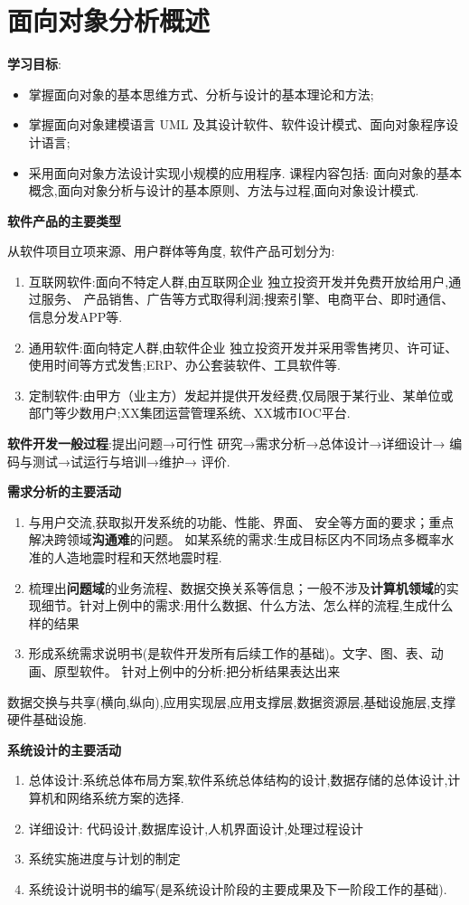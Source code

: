 \documentclass[../main.tex]{subfiles}
\begin{document}
\section{面向对象分析概述}
\textbf{学习目标}:
\begin{itemize}
  \item 掌握面向对象的基本思维方式、分析与设计的基本理论和方法;
  \item 掌握面向对象建模语言 UML
    及其设计软件、软件设计模式、面向对象程序设计语言;
  \item 采用面向对象方法设计实现小规模的应用程序. 课程内容包括:
    面向对象的基本概念,面向对象分析与设计的基本原则、方法与过程,面向对象设计模式.
\end{itemize}
\textbf{软件产品的主要类型}

从软件项目立项来源、用户群体等角度, 软件产品可划分为:
\begin{enumerate}
  \item 互联网软件:面向不特定人群,由互联网企业
    独立投资开发并免费开放给用户,通过服务、
    产品销售、广告等方式取得利润;搜索引擎、电商平台、即时通信、信息分发APP等.
  \item 通用软件:面向特定人群,由软件企业 独立投资开发并采用零售拷贝、许可证、
    使用时间等方式发售;ERP、办公套装软件、工具软件等.
  \item
    定制软件:由甲方（业主方）发起并提供开发经费,仅局限于某行业、某单位或部门等少数用户;XX集团运营管理系统、XX城市IOC平台.
\end{enumerate}
\textbf{软件开发一般过程}:提出问题→可行性 研究→需求分析→总体设计→详细设计→
编码与测试→试运行与培训→维护→ 评价.

\textbf{需求分析的主要活动}
\begin{enumerate}
  \item 与用户交流,获取拟开发系统的功能、性能、界面、
    安全等方面的要求；重点解决跨领域\textbf{沟通难}的问题。
    如某系统的需求:生成目标区内不同场点多概率水准的人造地震时程和天然地震时程.
  \item 梳理出\textbf{问题域}的业务流程、数据交换关系等信息；一般不涉及\textbf{计算机领域}的实现细节。针对上例中的需求:用什么数据、什么方法、怎么样的流程,生成什么样的结果
  \item 形成系统需求说明书(是软件开发所有后续工作的基础)。文字、图、表、动画、原型软件。
    针对上例中的分析:把分析结果表达出来
\end{enumerate}
数据交换与共享(横向,纵向),应用实现层,应用支撑层,数据资源层,基础设施层,支撑硬件基础设施.

\textbf{系统设计的主要活动}
\begin{enumerate}
  \item 总体设计:系统总体布局方案,软件系统总体结构的设计,数据存储的总体设计,计算机和网络系统方案的选择.
  \item 详细设计: 代码设计,数据库设计,人机界面设计,处理过程设计
  \item 系统实施进度与计划的制定
  \item 系统设计说明书的编写(是系统设计阶段的主要成果及下一阶段工作的基础).
\end{enumerate}
\end{document}
